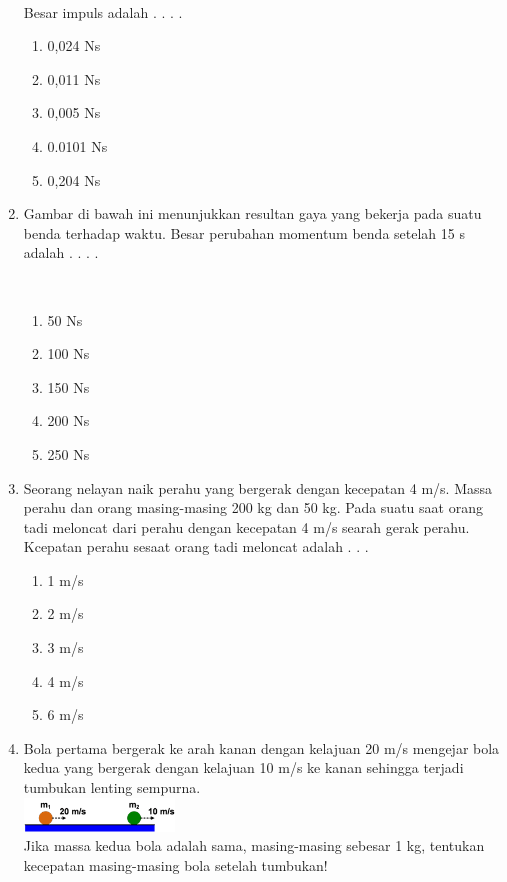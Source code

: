 \documentclass[10pt,a4paper]{extarticle}
\newcommand*\pilgan[1]{
\begin{enumerate}[label=\Alph*., itemsep=0pt,topsep=0pt,leftmargin=*,align=Center] #1 
\end{enumerate}}
\newcommand{\pilgani}[1]{                            \vspace{-0.3cm}\begin{multicols}{2}
 \begin{enumerate}[label=\Alph*., itemsep=0pt,topsep=0pt,leftmargin=*,align=Center]#1                     \end{enumerate}
 \phantom{ini cuma sapi, wedus, dan ayam}
 \end{multicols}}
\begin{document}
\begin{multicols*}{2}
\begin{enumerate}
\\
Besar impuls adalah . . . . \\
\pilgan{
\item 0,024 Ns
\item 0,011 Ns
\item 0,005 Ns
\item 0.0101 Ns
\item 0,204 Ns
}
\item Gambar di bawah ini menunjukkan resultan gaya yang bekerja pada suatu benda terhadap waktu. Besar perubahan momentum benda setelah 15 s adalah . . . .\\
\\
\pilgan{
\item 50 Ns
\item 100 Ns
\item 150 Ns
\item 200 Ns
\item 250 Ns
}

\item Seorang nelayan naik perahu yang bergerak dengan kecepatan 4 m/s. Massa perahu dan orang masing-masing 200 kg dan 50 kg. Pada suatu saat orang tadi meloncat dari perahu dengan kecepatan 4 m/s searah gerak perahu. Kcepatan perahu sesaat orang tadi meloncat adalah . . .
\pilgani{
        \item 1 m/s
        \item 2 m/s
        \item 3 m/s
        \item 4 m/s
        \item 6 m/s
        }
\vspace{2cm}


\item Bola pertama bergerak ke arah kanan dengan kelajuan 20 m/s mengejar bola kedua yang bergerak dengan kelajuan 10 m/s ke kanan sehingga terjadi tumbukan lenting sempurna. \\
\includegraphics[width=4cm]{pic/mom6}\\
Jika massa kedua bola adalah sama, masing-masing sebesar 1 kg, tentukan kecepatan masing-masing bola setelah tumbukan! 
\vspace{5cm}



\end{enumerate}
\end{multicols*}
\end{document}
